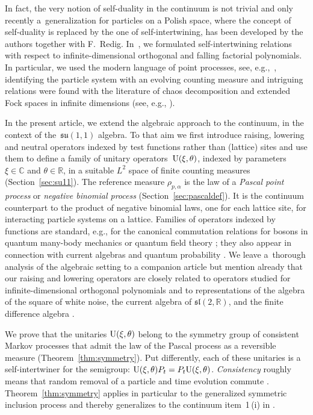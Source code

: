 \documentclass[10pt,a4paper]{amsart}
\numberwithin{equation}{section}
\newcommand{\R}{\mathbb{R}}
\newcommand{\C}{\mathbb{C}}
\newcommand{\1}{\mathbbm{1}}
\begin{document}
In fact, the very notion of self-duality in the continuum is not trivial and only recently a~generalization for particles on a Polish space, where the concept of self-duality is replaced by the one of self-intertwining, has been developed by the authors together with F.~Redig.
In~\cite{IntertwiningConsistent}, we formulated self-intertwining relations with respect to infinite-dimensional orthogonal and falling factorial polynomials. In particular, we used the modern language of point processes, see, e.g.,~\cite{last2016}, identifying the particle system with an evolving counting measure and intriguing relations were found with the literature of chaos decomposition and extended Fock spaces in infinite dimensions (see, e.g., \cite{lytvynov2003JFA}).

In the present article, we extend the algebraic approach to the continuum, in the context of the~$\mathfrak{su}(1,1)$ algebra. To that aim we first introduce raising, lowering and neutral operators indexed by test functions rather than (lattice) sites and use them to define a family of unitary operators~${\rm U}(\xi,\theta)$, indexed by parameters $\xi\in \C$ and $\theta \in \R$, in a suitable $L^2$ space of finite counting measures (Section~\ref{sec:su11}). The reference measure $\rho_{p,\alpha}$ is the law of a \emph{Pascal point process} or \emph{negative binomial process} (Section~\ref{sec:pascaldef}). It is the continuum counterpart to the product of negative binomial laws, one for each lattice site, for interacting particle systems on a lattice. Families of operators indexed by functions are standard, e.g., for the canonical commutation relations for bosons in quantum many-body mechanics or quantum field theory \cite[Section~X.7]{reedSimonII}; they also appear in connection with current algebras and quantum probability \cite{accardi2009quantum,araki1969}. We leave a~thorough analysis of the algebraic setting to a companion article \cite{algebraic_Floreani} but mention already that our raising and lowering operators are closely related to operators studied for infinite-dimensional orthogonal polynomials \cite{lytvynov2003JFA} and to representations of the algebra of the square of white noise, the current algebra of $\mathfrak{sl}(2,\R)$,
and the finite difference algebra \cite{accardi2002renormalized,boukas1991,sniady2000}.

We prove that the unitaries ${\rm U}(\xi,\theta)$ belong to the symmetry group of consistent Markov processes that admit the law of the Pascal process as a reversible measure (Theorem~\ref{thm:symmetry}). Put differently, each of these unitaries is a self-intertwiner for the semigroup: ${\rm U}(\xi,\theta) P_t = P_t {\rm U}(\xi,\theta)$. \emph{Consistency} roughly means that random removal of a particle and time evolution commute \cite{carinci2021consistent}. Theorem~\ref{thm:symmetry} applies in particular to the generalized symmetric inclusion process and thereby generalizes to the continuum item~1\,(i) in \cite[Theorem~3.1]{carinci2019orthogonal}.
\end{document}
